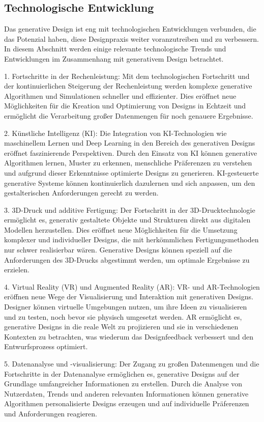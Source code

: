 \subsection*{Technologische Entwicklung}
Das generative Design ist eng mit technologischen Entwicklungen verbunden, die das Potenzial haben, diese Designpraxis weiter voranzutreiben und zu verbessern. In diesem Abschnitt werden einige relevante technologische Trends und Entwicklungen im Zusammenhang mit generativem Design betrachtet.

1. Fortschritte in der Rechenleistung: Mit dem technologischen Fortschritt und der kontinuierlichen Steigerung der Rechenleistung werden komplexe generative Algorithmen und Simulationen schneller und effizienter. Dies eröffnet neue Möglichkeiten für die Kreation und Optimierung von Designs in Echtzeit und ermöglicht die Verarbeitung großer Datenmengen für noch genauere Ergebnisse.

2. Künstliche Intelligenz (KI): Die Integration von KI-Technologien wie maschinellem Lernen und Deep Learning in den Bereich des generativen Designs eröffnet faszinierende Perspektiven. Durch den Einsatz von KI können generative Algorithmen lernen, Muster zu erkennen, menschliche Präferenzen zu verstehen und aufgrund dieser Erkenntnisse optimierte Designs zu generieren. KI-gesteuerte generative Systeme können kontinuierlich dazulernen und sich anpassen, um den gestalterischen Anforderungen gerecht zu werden.

3. 3D-Druck und additive Fertigung: Der Fortschritt in der 3D-Drucktechnologie ermöglicht es, generativ gestaltete Objekte und Strukturen direkt aus digitalen Modellen herzustellen. Dies eröffnet neue Möglichkeiten für die Umsetzung komplexer und individueller Designs, die mit herkömmlichen Fertigungsmethoden nur schwer realisierbar wären. Generative Designs können speziell auf die Anforderungen des 3D-Drucks abgestimmt werden, um optimale Ergebnisse zu erzielen.

4. Virtual Reality (VR) und Augmented Reality (AR): VR- und AR-Technologien eröffnen neue Wege der Visualisierung und Interaktion mit generativen Designs. Designer können virtuelle Umgebungen nutzen, um ihre Ideen zu visualisieren und zu testen, noch bevor sie physisch umgesetzt werden. AR ermöglicht es, generative Designs in die reale Welt zu projizieren und sie in verschiedenen Kontexten zu betrachten, was wiederum das Designfeedback verbessert und den Entwurfsprozess optimiert.

5. Datenanalyse und -visualisierung: Der Zugang zu großen Datenmengen und die Fortschritte in der Datenanalyse ermöglichen es, generative Designs auf der Grundlage umfangreicher Informationen zu erstellen. Durch die Analyse von Nutzerdaten, Trends und anderen relevanten Informationen können generative Algorithmen personalisierte Designs erzeugen und auf individuelle Präferenzen und Anforderungen reagieren.


